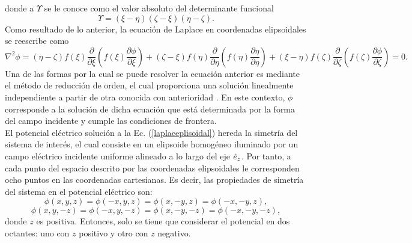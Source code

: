 donde a $\Upsilon$ se le conoce como el valor absoluto del determinante funcional \cite{Kellog}
\begin{equation}
	\Upsilon=(\xi-\eta)(\zeta-\xi)(\eta-\zeta).
\end{equation}
Como resultado de lo anterior, la ecuación de Laplace en coordenadas elipsoidales se reescribe como
\begin{equation}
	\nabla^2\phi=(\eta-\zeta)f(\xi)\frac{\partial}{\partial\xi}\left(f(\xi)\frac{\partial\phi}{\partial\xi}\right)+(\zeta-\xi)f(\eta)\frac{\partial}{\partial\eta}\left(f(\eta)\frac{\partial\eta}{\partial\eta}\right)+(\xi-\eta)f(\zeta)\frac{\partial}{\partial\zeta}\left(f(\zeta)\frac{\partial\phi}{\partial\zeta}\right)=0.
	\label{laplaceplisoidal}
\end{equation}
Una de las formas por la cual se puede resolver la ecuación anterior es mediante el método de reducción de orden, el cual proporciona una solución linealmente independiente a partir de otra conocida con anterioridad \cite{Braun}. En este contexto, $\phi$ corresponde a la solución de dicha ecuación que está determinada por la forma del campo incidente y cumple las condiciones de frontera. \\


El potencial eléctrico solución a la Ec. (\ref{laplaceplisoidal}) hereda la simetría del sistema de interés, el cual consiste en un elipsoide homogéneo iluminado por un campo eléctrico incidente uniforme alineado a lo largo del eje $\hat{e}_{z}$. Por tanto,  a cada punto del espacio descrito por las coordenadas elipsoidales le corresponden ocho puntos en las coordenadas cartesianas. Es decir, las propiedades de simetría del sistema en el potencial eléctrico son:
\begin{equation}
    \phi(x,y,z)=\phi(-x,y,z)=\phi(x,-y,z)=\phi(-x,-y,z),
\end{equation}
\begin{equation}
    \phi(x,y,-z)=\phi(-x,y ,-z)=\phi(x,-y,-z)=\phi(-x,-y,-z),
\end{equation}
donde $z$ es positiva. Entonces, solo se tiene que considerar el potencial en dos octantes: uno con $z$ positivo y otro con $z$ negativo. \\

